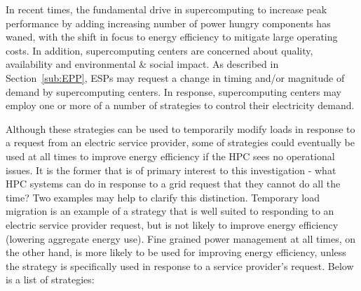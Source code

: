 In recent times, the fundamental drive in supercomputing to increase peak performance by adding increasing number of power hungry components has waned, with the shift in focus to energy efficiency to mitigate large operating costs.
In addition, supercomputing centers are concerned about quality, availability and environmental \&  social impact.
As described in Section~\ref{sub:EPP}, ESPs may request 
a change in timing and/or magnitude of demand by supercomputing centers.  
In response, supercomputing centers may employ one or more of a number of strategies to control their 
electricity demand.

Although these strategies can be used to temporarily modify loads in response to a request from an 
electric service provider, some of strategies could eventually be used at all times to improve energy 
efficiency if the HPC sees no operational issues. It is the former that is of primary interest to this 
investigation - what HPC systems can do in response to a grid request that they cannot do all the time? 
Two examples may help to clarify this distinction. Temporary load migration is an example of a strategy 
that is well suited to responding to an electric service provider request, but is not likely to improve 
energy efficiency (lowering aggregate energy use). Fine grained power management at all times, on 
the other hand, is more likely to be used for improving energy efficiency, unless the strategy is 
specifically used in response to a service provider's request. 
Below is a list of strategies:

